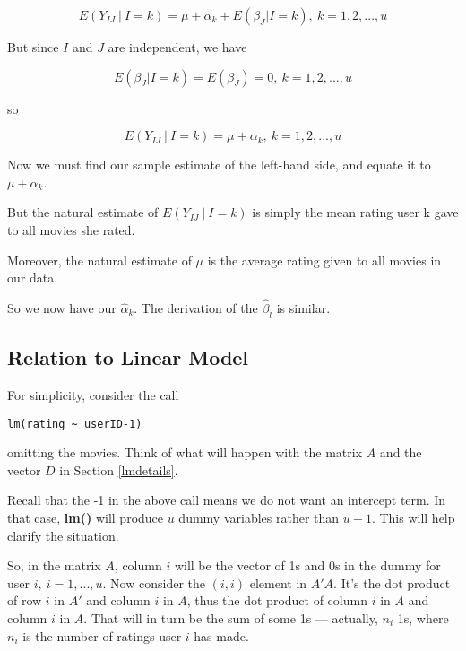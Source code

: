 \begin{equation}
E(Y_{IJ} ~|~ I = k) = \mu + \alpha_k + E(\beta_J | I = k), ~ k=1,2,...,u 
\end{equation}

But since $I$ and $J$ are independent, we have

\begin{equation}
E(\beta_J | I = k) = E(\beta_J) = 0, ~ k=1,2,...,u
\end{equation} 

so

\begin{equation}
E(Y_{IJ} ~|~ I = k) = \mu + \alpha_k, ~ k=1,2,...,u
\end{equation}

Now we must find our sample estimate of the left-hand side, and equate
it to $\mu + \alpha_k$.

But the natural estimate of $E(Y_{IJ} ~|~ I = k)$ is simply the mean
rating user k gave to all movies she rated.

Moreover, the natural estimate of $\mu$ is the average rating given to
all movies in our data.

So we now have our $\widehat{\alpha}_k$.  The derivation of the
$\widehat{\beta}_l$ is similar.

\subsection{Relation to Linear Model}

For simplicity, consider the call

\begin{lstlisting}
lm(rating ~ userID-1)
\end{lstlisting}

omitting the movies.  Think of what will happen with the matrix $A$ and
the vector $D$ in Section \ref{lmdetails}.  

Recall that the -1 in the above call means we do not want an intercept
term.  In that case, \textbf{lm()} will produce $u$ dummy variables
rather than $u-1$.  This will help clarify the situation.

So, in the matrix $A$, column $i$ will be the vector of 1s and 0s in the
dummy for user $i,~ i=1,...,u$.  Now consider the $(i,i)$ element in
$A'A$.  It's the dot product of row $i$ in $A'$ and column $i$ in $A$,
thus the dot product of column $i$ in $A$ and column $i$ in $A$.  That
will in turn be the sum of some 1s --- actually, $n_i$ 1s, where $n_i$
is the number of ratings user $i$ has made.

